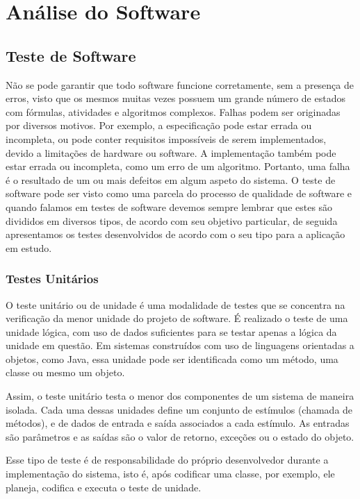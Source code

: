 \chapter{Análise do Software} 
\label{sec:tp1}

\section{Teste de Software}
Não se pode garantir que todo software funcione corretamente, sem a presença de erros, visto que os mesmos muitas vezes possuem um grande número de estados com fórmulas, atividades e algoritmos complexos. Falhas podem ser originadas por diversos motivos. Por exemplo, a especificação pode estar errada ou incompleta, ou pode conter requisitos impossíveis de serem implementados, devido a limitações de hardware ou software. A implementação também pode estar errada ou incompleta, como um erro de um algoritmo. Portanto, uma falha é o resultado de um ou mais defeitos em algum aspeto do sistema.
O teste de software pode ser visto como uma parcela do processo de qualidade de software e quando falamos em testes de software devemos sempre lembrar que estes são divididos em diversos tipos, de acordo com seu objetivo particular, de seguida apresentamos os testes desenvolvidos de acordo com o seu tipo para a aplicação em estudo. 

\subsection{Testes Unitários}
O teste unitário ou de unidade é uma modalidade de testes que se concentra na verificação da menor unidade do projeto de software. É realizado o teste de uma unidade lógica, com uso de dados suficientes para se testar apenas a lógica da unidade em questão. Em sistemas construídos com uso de linguagens orientadas a objetos, como Java, essa unidade pode ser identificada como um método, uma classe ou mesmo um objeto.

Assim, o teste unitário  testa o menor dos componentes de um sistema de maneira isolada. Cada uma dessas unidades define um conjunto de estímulos (chamada de métodos), e de dados de entrada e saída associados a cada estímulo. As entradas são parâmetros e as saídas são o valor de retorno, exceções ou o estado do objeto.

Esse tipo de teste é de responsabilidade do próprio desenvolvedor durante a implementação do sistema, isto é, após codificar uma classe, por exemplo, ele planeja, codifica e executa o teste de unidade.

